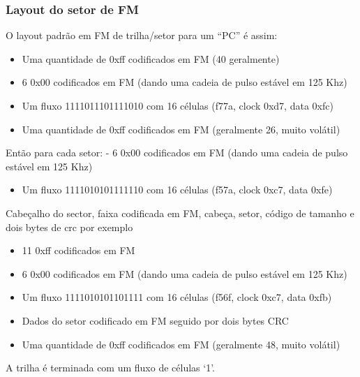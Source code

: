 \documentclass[letterpaper,10pt,brazil]{sphinxmanual}
\begin{document}
\subsubsection{Layout do setor de FM}
\label{techspecs/floppy:layout-do-setor-de-fm}
O layout padrão em FM de trilha/setor para um ``PC'' é assim:
\begin{itemize}
\item {} 
Uma quantidade de 0xff codificados em FM (40 geralmente)

\item {} 
6 0x00 codificados em FM (dando uma cadeia de pulso estável em 125 Khz)

\item {} 
Um fluxo 1111011101111010 com 16 células (f77a, clock 0xd7, data 0xfc)

\item {} 
Uma quantidade de 0xff codificados em FM (geralmente 26, muito volátil)

\end{itemize}

Então para cada setor:
- 6 0x00 codificados em FM (dando uma cadeia de pulso estável em 125 Khz)
\begin{itemize}
\item {} 
Um fluxo 1111010101111110 com 16 células (f57a, clock 0xc7, data 0xfe)

\end{itemize}

Cabeçalho do sector, faixa codificada em FM, cabeça, setor, código de
tamanho e dois bytes de crc por exemplo
\begin{itemize}
\item {} 
11 0xff codificados em FM

\item {} 
6 0x00 codificados em FM (dando uma cadeia de pulso estável em 125 Khz)

\item {} 
Um fluxo 1111010101101111 com 16 células (f56f, clock 0xc7, data 0xfb)

\item {} 
Dados do setor codificado em FM seguido por dois bytes CRC

\item {} 
Uma quantidade de 0xff codificados em FM (geralmente 48, muito volátil)

\end{itemize}

A trilha é terminada com um fluxo de células `1'.
\end{document}
